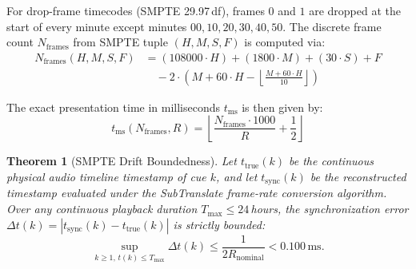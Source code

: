 \documentclass[11pt,a4paper,reqno]{article}
\newtheorem{theorem}{Theorem}[section]
\theoremstyle{definition}
\theoremstyle{remark}
\begin{document}
For drop-frame timecodes (SMPTE 29.97\,df), frames $0$ and $1$ are dropped at the start of every minute except minutes $00, 10, 20, 30, 40, 50$. The discrete frame count $N_{\text{frames}}$ from SMPTE tuple $(H, M, S, F)$ is computed via:
\begin{equation}
\begin{aligned}
N_{\text{frames}}(H, M, S, F) &= (108000 \cdot H) + (1800 \cdot M) + (30 \cdot S) + F \\
&\quad - 2 \cdot \left( M + 60 \cdot H - \left\lfloor \frac{M + 60 \cdot H}{10} \right\rfloor \right)
\end{aligned}
\end{equation}

The exact presentation time in milliseconds $t_{\text{ms}}$ is then given by:
\begin{equation}
t_{\text{ms}}(N_{\text{frames}}, R) = \left\lfloor \frac{N_{\text{frames}} \cdot 1000}{R} + \frac{1}{2} \right\rfloor
\end{equation}

\begin{theorem}[SMPTE Drift Boundedness]
\label{thm:smpte_drift}
Let $t_{\text{true}}(k)$ be the continuous physical audio timeline timestamp of cue $k$, and let $t_{\text{sync}}(k)$ be the reconstructed timestamp evaluated under the SubTranslate frame-rate conversion algorithm. Over any continuous playback duration $T_{\text{max}} \le 24$\,hours, the synchronization error $\Delta t(k) = |t_{\text{sync}}(k) - t_{\text{true}}(k)|$ is strictly bounded:
\begin{equation}
\sup_{k \ge 1, \, t(k) \le T_{\text{max}}} \Delta t(k) \le \frac{1}{2 R_{\text{nominal}}} < 0.100\,\mathrm{ms}.
\end{equation}
\end{theorem}
\end{document}
